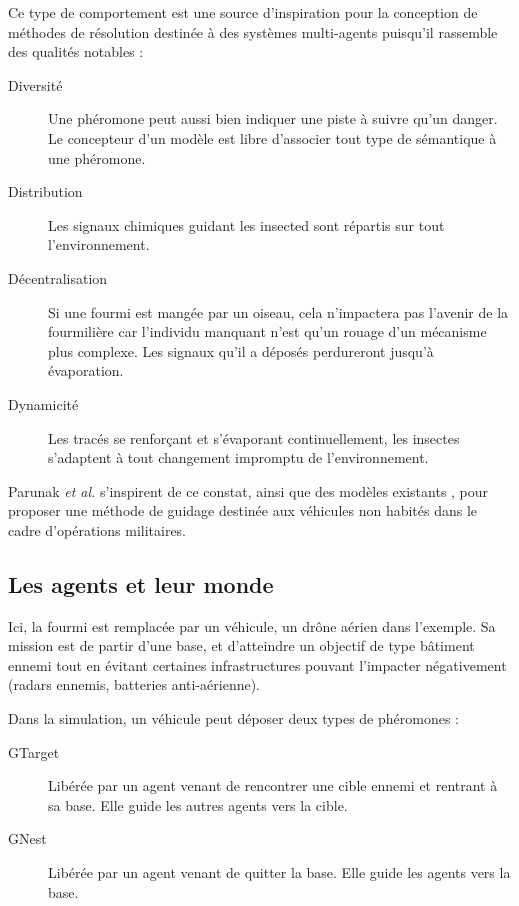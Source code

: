 \documentclass[12pt]{article}
\begin{document}
Ce type de comportement est une source d'inspiration pour la
conception de méthodes de résolution destinée à des systèmes
multi-agents puisqu'il rassemble des qualités notables
\cite{parunak} :

\begin{description}
\item[Diversité]{Une phéromone peut aussi bien indiquer une piste à suivre qu'un danger. Le concepteur d'un modèle est libre d'associer tout type de sémantique à une phéromone.}
  \item[Distribution]{Les signaux chimiques guidant les insected sont répartis
sur tout l'environnement.}
  \item[Décentralisation]{Si une fourmi est mangée par un oiseau, cela
  n'impactera pas l'avenir de la fourmilière car l'individu manquant
  n'est qu'un rouage d'un mécanisme plus complexe. Les signaux qu'il a déposés perdureront jusqu'à évaporation.}
  \item[Dynamicité]{Les tracés se renforçant et s'évaporant continuellement, les insectes
s'adaptent à tout changement impromptu de l'environnement.}
\end{description}

Parunak \textit{et al.} s'inspirent de ce constat, ainsi que des
modèles existants \cite{dorigo}, pour proposer une méthode de guidage
destinée aux véhicules non habités dans le cadre
d'opérations militaires.

\subsection{Les agents et leur monde}

Ici, la fourmi est remplacée par un véhicule, un drône aérien dans l'exemple. Sa mission
est de partir d'une base, et d'atteindre un objectif de type bâtiment ennemi tout en évitant
certaines infrastructures pouvant l'impacter négativement (radars ennemis, batteries anti-aérienne).

Dans la simulation, un véhicule peut déposer deux types de phéromones :

\begin{description}
  \item[GTarget]{Libérée par un agent venant de rencontrer une cible ennemi et rentrant à sa base. Elle guide les autres agents vers la cible.}
  \item[GNest]{Libérée par un agent venant de quitter la base. Elle guide les agents vers la base.}
\end{description}
\end{document}
